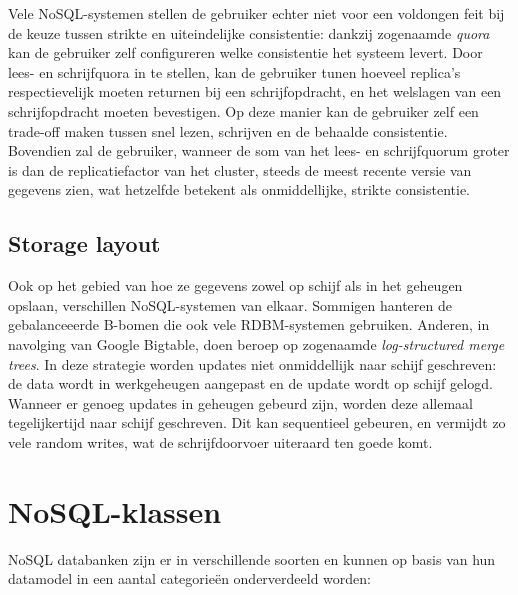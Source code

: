 Vele NoSQL-systemen stellen de gebruiker echter niet voor een voldongen feit bij de keuze tussen strikte en uiteindelijke consistentie: dankzij zogenaamde \textit{quora} kan de gebruiker zelf configureren welke consistentie het systeem levert. Door lees- en schrijfquora in te stellen, kan de gebruiker tunen hoeveel replica's respectievelijk moeten returnen bij een schrijfopdracht, en het welslagen van een schrijfopdracht moeten bevestigen. Op deze manier kan de gebruiker zelf een trade-off maken tussen snel lezen, schrijven en de behaalde consistentie. Bovendien zal de gebruiker, wanneer de som van het lees- en schrijfquorum groter is dan de replicatiefactor van het cluster, steeds de meest recente versie van gegevens zien, wat hetzelfde betekent als onmiddellijke, strikte consistentie.

\subsection{Storage layout}
Ook op het gebied van hoe ze gegevens zowel op schijf als in het geheugen opslaan, verschillen NoSQL-systemen van elkaar. Sommigen hanteren de gebalanceeerde B-bomen die ook vele RDBM-systemen gebruiken. Anderen, in navolging van Google Bigtable, doen beroep op zogenaamde \textit{log-structured merge trees}. In deze strategie worden updates niet onmiddellijk naar schijf geschreven: de data wordt in werkgeheugen aangepast en de update wordt op schijf gelogd. Wanneer er genoeg updates in geheugen gebeurd zijn, worden deze allemaal tegelijkertijd naar schijf geschreven. Dit kan sequentieel gebeuren, en vermijdt zo vele random writes, wat de schrijfdoorvoer uiteraard ten goede komt. 


\section{NoSQL-klassen}

NoSQL databanken zijn er in verschillende soorten en kunnen op basis van hun datamodel in een aantal categorie\"en onderverdeeld worden:

